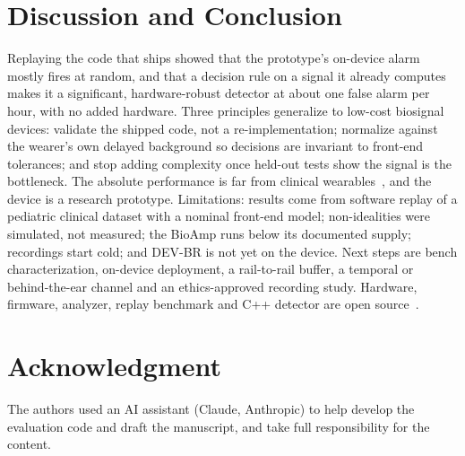 \documentclass[conference,letterpaper]{IEEEtran}
\begin{document}
\section{Discussion and Conclusion}
Replaying the code that ships showed that the prototype's on-device alarm mostly fires at random, and that a decision rule on a signal it already computes makes it a significant, hardware-robust detector at about one false alarm per hour, with no added hardware. Three principles generalize to low-cost biosignal devices: validate the shipped code, not a re-implementation; normalize against the wearer's own delayed background so decisions are invariant to front-end tolerances; and stop adding complexity once held-out tests show the signal is the bottleneck. The absolute performance is far from clinical wearables~\cite{beniczky2021guideline}, and the device is a research prototype. Limitations: results come from software replay of a pediatric clinical dataset with a nominal front-end model; non-idealities were simulated, not measured; the BioAmp runs below its documented supply; recordings start cold; and DEV-BR is not yet on the device. Next steps are bench characterization, on-device deployment, a rail-to-rail buffer, a temporal or behind-the-ear channel and an ethics-approved recording study. Hardware, firmware, analyzer, replay benchmark and C++ detector are open source~\cite{vera_repo}.

\section*{Acknowledgment}
The authors used an AI assistant (Claude, Anthropic) to help develop the evaluation code and draft the manuscript, and take full responsibility for the content.



\end{document}
